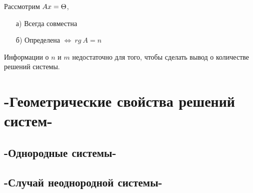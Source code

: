 Рассмотрим $Ax=\Theta$, 
\begin{itemize}
\item[а)] Всегда совместна
\item[б)] Определена $\Longleftrightarrow\ rg\ A=n$
\end{itemize}
Информации о $n$ и $m$ недостаточно для того, чтобы сделать вывод о количестве решений системы.
\chapter{-Геометрические свойства решений систем-}
\section{-Однородные системы-}
\section{-Случай неоднородной системы-}
